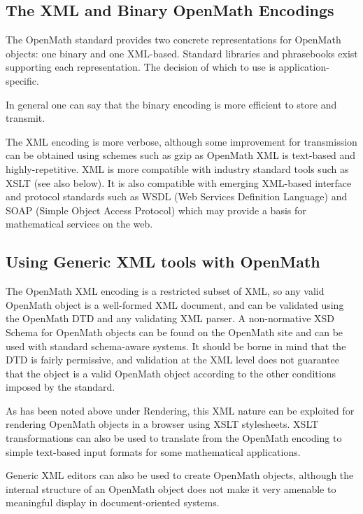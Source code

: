 \documentclass[keylogo]{openmath}
\begin{document}
\subsection {The XML and Binary OpenMath Encodings}

The OpenMath standard provides two concrete representations for
OpenMath objects: one binary and one XML-based. Standard libraries and
phrasebooks exist supporting each representation. The decision of
which to use is application-specific.

In general one can say that the binary encoding is more efficient to
store and transmit.

The XML encoding is more verbose, although some improvement for
transmission can be obtained using schemes such as gzip as OpenMath
XML is text-based and highly-repetitive.  XML is more compatible with
industry standard tools such as XSLT (see also below). It is also
compatible with emerging XML-based interface and protocol standards
such as WSDL (Web Services Definition Language) and SOAP (Simple
Object Access Protocol) which may provide a basis for mathematical
services on the web.

\subsection {Using Generic XML tools with OpenMath}

The OpenMath XML encoding is a restricted subset of XML, so any valid
OpenMath object is a well-formed XML document, and can be validated
using the OpenMath DTD and any validating XML parser. A non-normative
XSD Schema for OpenMath objects can be found on the OpenMath site and
can be used with standard schema-aware systems.  It should be borne in
mind that the DTD is fairly permissive, and validation at the XML
level does not guarantee that the object is a valid OpenMath object
according to the other conditions imposed by the standard.

As has been noted above under Rendering, this XML nature can be
exploited for rendering OpenMath objects in a browser using XSLT
stylesheets. XSLT transformations can also be used to translate from
the OpenMath encoding to simple text-based input formats for some
mathematical applications.

Generic XML editors can also be used to create OpenMath objects,
although the internal structure of an OpenMath object does not make it
very amenable to meaningful display in document-oriented systems.
\end{document}
